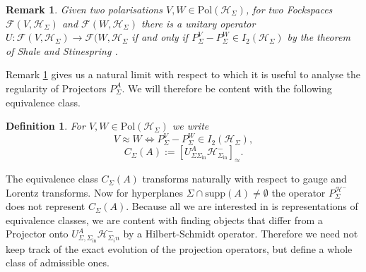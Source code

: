 \documentclass[a4paper,11pt]{article}
\newtheorem{de}{Definition}
\newtheorem{rmk}{Remark}
\begin{document}
\begin{rmk}\label{WhyUseApprox}
Given two polarisations \(V,W\in \text{Pol}(\mathcal{H}_\Sigma)\), for two Fockspaces \(\mathcal{F}(V,\mathcal{H}_\Sigma)\) and 
\(\mathcal{F}(W,\mathcal{H}_\Sigma)\) there is a unitary operator \(U: \mathcal{F}(V,\mathcal{H}_\Sigma) \rightarrow \mathcal{F}(W,\mathcal{H}_\Sigma\)
if and only if \(P^V_\Sigma - P^W_\Sigma \in I_2(\mathcal{H}_\Sigma)\) by the theorem of Shale and Stinespring 
\cite{Shale Stinespring 1965}.
\end{rmk}
Remark \ref{WhyUseApprox} gives us a natural limit with 
respect to which it is useful
to analyse the regularity of Projectors \(P_\Sigma^A\). We will therefore be content with the following equivalence class.
\begin{de}
For \(V,W\in \text{Pol}(\mathcal{H}_\Sigma)\) we write
\begin{equation}
V\approx W \iff P^V_\Sigma - P^W_\Sigma \in I_2(\mathcal{H}_\Sigma),
\end{equation}
\begin{equation}
C_\Sigma (A):= [ U_{\Sigma \Sigma_{\text{in}}}^A \mathcal{H}_{\Sigma_{\text{in}}}^-]_\approx.
\end{equation}
\end{de}


The equivalence class \(C_\Sigma(A)\) transforms naturally with respect to gauge and Lorentz transforms\cite{ivp2}. 
Now for hyperplanes \(\Sigma\cap \text{supp}(A)\neq \emptyset\) the operator \(P^{\mathcal{H}^-}_{\Sigma} \) does not represent
\(C_\Sigma(A)\). Because all we are interested in is representations of equivalence classes, we are content with finding
objects that differ from a Projector onto \(U_{\Sigma,\Sigma_{\text{in}}}^A \mathcal{H}_{\Sigma_in}^-\) by a Hilbert-Schmidt operator.
Therefore we need not keep track of the exact evolution of the projection operators, but define a whole class of admissible ones.
\end{document}
